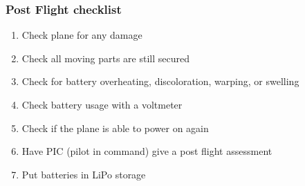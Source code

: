 \documentclass{article}
\begin{document}
\subsubsection{Post Flight checklist}
\begin{enumerate}[itemsep=-5pt]
  \item Check plane for any damage
  \item Check all moving parts are still secured
  \item Check for battery overheating, discoloration, warping, or swelling
  \item Check battery usage with a voltmeter
  \item Check if the plane is able to power on again
  \item Have PIC (pilot in command) give a post flight assessment
  \item Put batteries in LiPo storage
\end{enumerate}




\newpage


\end{document}
